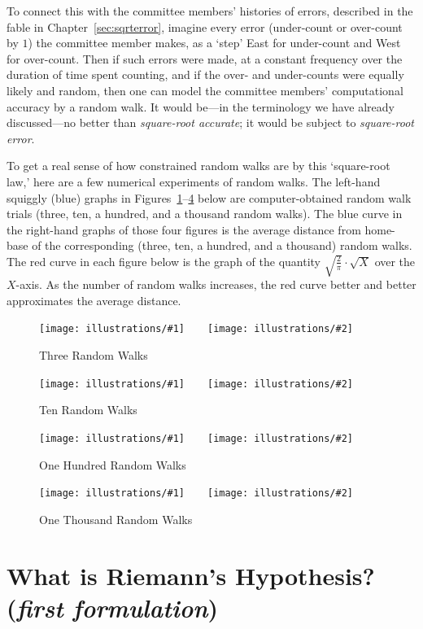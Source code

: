 \documentclass[openany]{book}
\newcommand{\illtwo}[4]{%
   \begin{figure}[H]\centering%
   \texttt{[image: illustrations/\#1]}$\qquad$\texttt{[image: illustrations/\#2]}%
   \caption{#4}%
    \end{figure}}
\theoremstyle{plain}
\theoremstyle{definition}
\begin{document}
  To connect this with the committee members' histories of errors, described in the fable in Chapter~\ref{sec:sqrterror}, imagine  every  error (under-count or over-count by $1$) the committee member makes, as a `step' East for under-count and West for over-count. Then if such errors were made, at a constant frequency over the duration of time spent counting, and if the over- and under-counts were equally likely and random, then one can model the committee members' computational  accuracy by a random walk. It would be---in the terminology we have already discussed---no better than {\it square-root accurate}; it would be subject to {\it square-root error}.

   To get a real sense of how constrained random walks are by this `square-root law,' here are a few numerical experiments of random walks. The left-hand squiggly (blue) graphs in Figures~\ref{fig:random_walks_3}--\ref{fig:random_walks_1000} below are computer-obtained random walk trials (three, ten, a hundred, and a thousand random walks). The blue curve in the right-hand graphs of those four figures is the average distance from home-base of the corresponding (three, ten, a hundred, and a thousand) random walks.
The red curve in each figure below is the graph of the quantity $\sqrt{\frac{2}{\pi}}\cdot {\sqrt X}$ over the $X$-axis.
As the number of random walks increases, the red curve
better and better approximates the average distance.

\illtwo{random_walks-3}{random_walks-3-mean}{.45}{Three Random Walks\label{fig:random_walks_3}}

\illtwo{random_walks-10}{random_walks-10-mean}{.45}{Ten Random Walks\label{fig:random_walks_10}}

\illtwo{random_walks-100}{random_walks-100-mean}{.45}{One Hundred Random Walks\label{fig:random_walks_100}}

\illtwo{random_walks-1000}{random_walks-1000-mean}{.45}{One Thousand Random Walks\label{fig:random_walks_1000}}





\chapter[What is Riemann's Hypothesis?] { What is Riemann's Hypothesis?  ({\em first formulation})\label{sec:rh1}}
\end{document}
